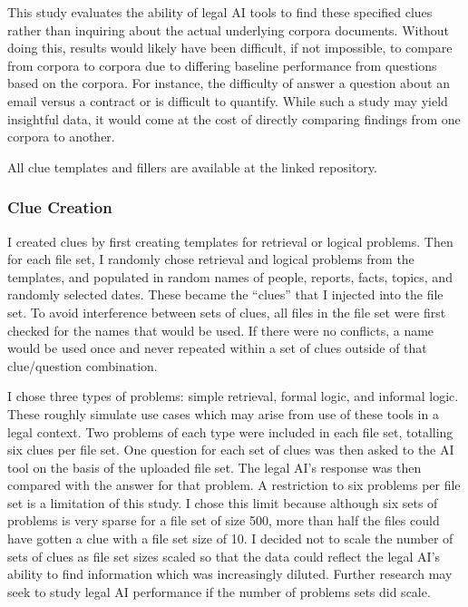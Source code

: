\documentclass[
]{article}
\begin{document}
This study evaluates the ability of legal AI tools to find these
specified clues rather than inquiring about the actual underlying
corpora documents. Without doing this, results would likely have been
difficult, if not impossible, to compare from corpora to corpora due to
differing baseline performance from questions based on the corpora. For
instance, the difficulty of answer a question about an email versus a
contract or is difficult to quantify. While such a study may yield
insightful data, it would come at the cost of directly comparing
findings from one corpora to another.

All clue templates and fillers are available at the linked repository.

\subsubsection{Clue Creation}\label{clue-creation}

I created clues by first creating templates for retrieval or logical
problems. Then for each file set, I randomly chose retrieval and logical
problems from the templates, and populated in random names of people,
reports, facts, topics, and randomly selected dates. These became the
``clues'' that I injected into the file set. To avoid interference
between sets of clues, all files in the file set were first checked for
the names that would be used. If there were no conflicts, a name would
be used once and never repeated within a set of clues outside of that
clue/question combination.

I chose three types of problems: simple retrieval, formal logic, and
informal logic. These roughly simulate use cases which may arise from
use of these tools in a legal context. Two problems of each type were
included in each file set, totalling six clues per file set. One
question for each set of clues was then asked to the AI tool on the
basis of the uploaded file set. The legal AI's response was then
compared with the answer for that problem. A restriction to six problems
per file set is a limitation of this study. I chose this limit because
although six sets of problems is very sparse for a file set of size 500,
more than half the files could have gotten a clue with a file set size
of 10. I decided not to scale the number of sets of clues as file set
sizes scaled so that the data could reflect the legal AI's ability to
find information which was increasingly diluted. Further research may
seek to study legal AI performance if the number of problems sets did
scale.
\end{document}
